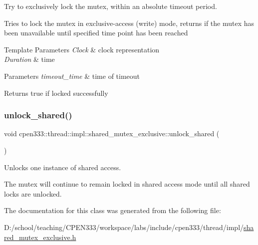 Try to exclusively lock the mutex, within an absolute timeout period. 

Tries to lock the mutex in exclusive-\/access (write) mode, returns if the mutex has been unavailable until specified time point has been reached


\begin{DoxyTemplParams}{Template Parameters}
{\em Clock} & clock representation \\
\hline
{\em Duration} & time \\
\hline
\end{DoxyTemplParams}

\begin{DoxyParams}{Parameters}
{\em timeout\+\_\+time} & time of timeout \\
\hline
\end{DoxyParams}
\begin{DoxyReturn}{Returns}
true if locked successfully 
\end{DoxyReturn}
\mbox{\label{classcpen333_1_1thread_1_1impl_1_1shared__mutex__exclusive_ab80e738628379fd1884aed75cf2b9081}} 
\subsubsection{\texorpdfstring{unlock\+\_\+shared()}{unlock\_shared()}}
{\footnotesize\ttfamily void cpen333\+::thread\+::impl\+::shared\+\_\+mutex\+\_\+exclusive\+::unlock\+\_\+shared (\begin{DoxyParamCaption}{ }\end{DoxyParamCaption})\hspace{0.3cm}{\ttfamily [inline]}}



Unlocks one instance of shared access. 

The mutex will continue to remain locked in shared access mode until all shared locks are unlocked. 

The documentation for this class was generated from the following file\+:\begin{DoxyCompactItemize}
\item 
D\+:/school/teaching/\+C\+P\+E\+N333/workspace/labs/include/cpen333/thread/impl/\hyperlink{thread_2impl_2shared__mutex__exclusive_8h}{shared\+\_\+mutex\+\_\+exclusive.\+h}\end{DoxyCompactItemize}
